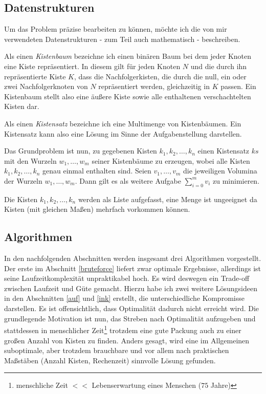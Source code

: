 \subsection{Datenstrukturen}
 Um das Problem präzise bearbeiten zu können, möchte ich die von mir verwendeten Datenstrukturen - zum Teil auch mathematisch - beschreiben.

 Als einen \emph{Kistenbaum} bezeichne ich einen binären Baum bei dem jeder Knoten eine Kiste repräsentiert.
 In diesem gilt für jeden Knoten $N$ und die durch ihn repräsentierte Kiste $K$, dass die Nachfolgerkisten,
 die durch die null, ein oder zwei Nachfolgerknoten von $N$ repräsentiert werden, gleichzeitig in $K$ passen.
 Ein Kistenbaum stellt also eine äußere Kiste sowie alle enthaltenen verschachtelten Kisten dar.

 Als einen \emph{Kistensatz} bezeichne ich eine Multimenge von Kistenbäumen.
 Ein Kistensatz kann also eine Lösung im Sinne der Aufgabenstellung darstellen.

 Das Grundproblem ist nun, zu gegebenen Kisten $k_1,k_2,\dots,k_n$
 einen Kistensatz $ks$ mit den Wurzeln $w_1,\dots,w_m$ seiner Kistenbäume zu erzeugen, wobei alle Kisten $k_1,k_2,\dots,k_n$ genau einmal enthalten sind.
 Seien $v_1,\dots,v_m$ die jeweiligen Volumina der Wurzeln $w_1,\dots,w_m$. Dann gilt es als weitere Aufgabe $\sum_{i=0}^{m}{v_i}$ zu minimieren.

 Die Kisten $k_1,k_2,\dots,k_n$ werden als Liste aufgefasst, eine Menge ist ungeeignet da Kisten (mit gleichen Maßen) mehrfach vorkommen können.

\clearpage
\subsection{Algorithmen}
 In den nachfolgenden Abschnitten werden insgesamt drei Algorithmen vorgestellt.
 Der erste im Abschnitt \ref{bruteforce} liefert zwar optimale Ergebnisse, allerdings ist seine Laufzeitkomplexität unpraktikabel hoch.
 Es wird deswegen ein Trade-off zwischen Laufzeit und Güte gemacht.
 Hierzu habe ich zwei weitere Lösungsideen in den Abschnitten \ref{auf} und \ref{ink} erstellt, die unterschiedliche Kompromisse darstellen.
 Es ist offensichtlich, dass Optimalität dadurch nicht erreicht wird.
 Die grundlegende Motivation ist nun,
 das Streben nach Optimalität aufzugeben und stattdessen in menschlicher Zeit\footnote{menschliche Zeit $<<$ Lebenserwartung eines Menschen ($75$ Jahre)}
  trotzdem eine gute Packung auch zu einer großen Anzahl von Kisten zu finden.
 Anders gesagt, wird eine im Allgemeinen suboptimale, aber trotzdem brauchbare und vor allem nach praktischen Maßstäben (Anzahl Kisten, Rechenzeit) sinnvolle Lösung gefunden.
